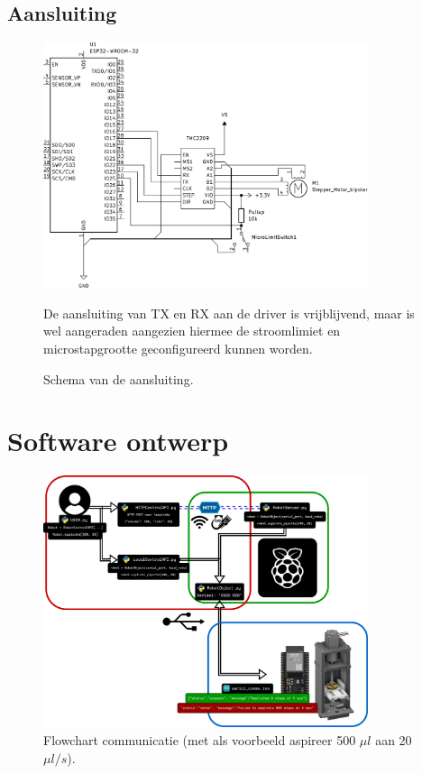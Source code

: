 \subsection{Aansluiting}
\begin{figure}
    \centering
    \includegraphics[width=0.85\textwidth]{figures/Wiring_BW.png}
    \caption{Schema van de aansluiting.}\label{fig:schematische_aansluiting}
    De aansluiting van TX en RX aan de driver is vrijblijvend, maar is wel aangeraden aangezien hiermee de stroomlimiet en microstapgrootte geconfigureerd kunnen worden.

\end{figure}

\section{Software ontwerp}
\begin{figure}[H]
    \centering
    \includegraphics[width=0.85\textwidth]{figures/Flowchart.png}
    \caption{Flowchart communicatie (met als voorbeeld aspireer 500 $\mu l$ aan 20 $\mu l/s$).}\label{fig:Flowchart}
\end{figure}

